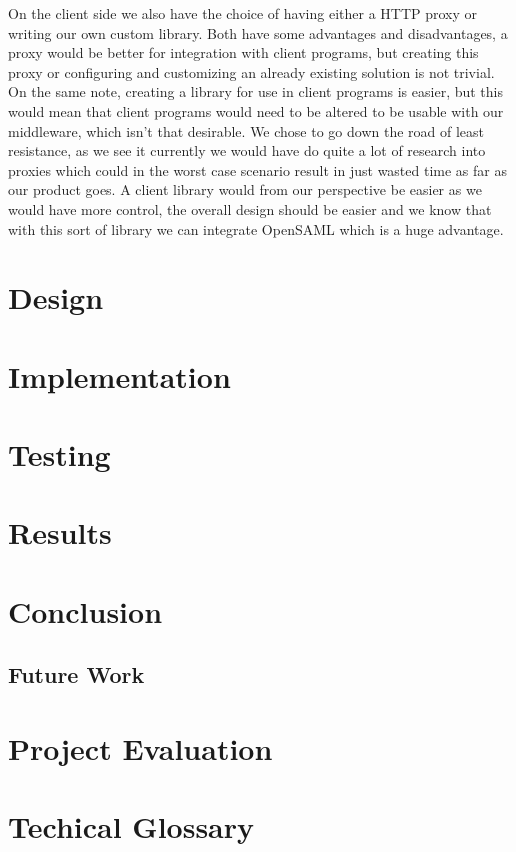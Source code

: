 \documentclass[12pt]{article}
\begin{document}
        On the client side we also have the choice of having either a HTTP proxy or writing our own custom library. Both have some advantages and disadvantages, a proxy would be better for integration with client programs, but creating this proxy or configuring and customizing an already existing solution is not trivial. On the same note, creating a library for use in client programs is easier, but this would mean that client programs would need to be altered to be usable with our middleware, which isn’t that desirable. We chose to go down the road of least resistance, as we see it currently we would have do quite a lot of research into proxies which could in the worst case scenario result in just wasted time as far as our product goes. A client library would from our perspective be easier as we would have more control, the overall design should be easier and we know that with this sort of library we can integrate OpenSAML which is a huge advantage.  
              
\section{Design}\label{design}
\section{Implementation}\label{implementation}
\section{Testing}\label{teting}
\section{Results}\label{results}
\section{Conclusion}\label{conclusion}
    \subsection{Future Work}\label{future}
\section{Project Evaluation}\label{evaluation}

\appendix
\section{Techical Glossary}\label{glossary}
    
\end{document}
